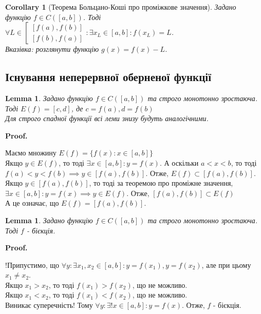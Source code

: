 \documentclass[a4paper, 14pt]{article}
\makeatletter
\def\qed{$\blacksquare$}
\theoremstyle{theoremdd}
\theoremstyle{theoremdd}
\theoremstyle{theoremdd}
\theoremstyle{theoremdd}
\theoremstyle{theoremdd}
\theoremstyle{theoremdd}
\theoremstyle{theoremdd}
\newtheorem{lemma}[theorem]{Lemma}
\theoremstyle{theoremdd}
\newtheorem{corollary}[theorem]{Corollary}
\renewenvironment{proof}[1][Proof.\\]{\par
\pushQED{\hfill \qed}%
\normalfont \topsep6\p@\@plus6\p@\relax
\trivlist
\item\relax
{\bfseries
#1\@addpunct{.}}\hspace\labelsep\ignorespaces
}{%
\popQED\endtrivlist\@endpefalse
}
\makeatother
\begin{document}
\begin{corollary}[Теорема Больцано-Коші про проміжкове значення]
Задано функцію $f \in C([a,b])$.
Тоді $\forall L \in \left[ \begin{gathered}  \left[f(a),f(b) \right] \\ \left[f(b),f(a) \right] \end{gathered} \right.: \exists x_L \in [a,b]: f(x_L) = L$.\\
\textit{Вказівка: розглянути функцію $g(x) = f(x) - L$.}
\end{corollary}

\subsection{Існування неперервної оберненої функції}
\begin{lemma}
Задано функцію $f \in C([a,b])$ та строго монотонно зростаюча. Тоді $E(f) = [c,d]$, де $c = f(a), d = f(b)$\\
\textit{Для строго спадної функції всі леми знизу будуть аналогічними.}
\end{lemma}

\begin{proof}
Маємо множину $E(f) = \{f(x): x \in [a,b] \}$\\
Якщо $y \in E(f)$, то тоді $\exists x \in [a,b]: y = f(x)$. А оскільки $a < x < b$, то тоді $f(a) < y < f(b) \implies y \in [f(a),f(b)]$. Отже, $E(f) \subset [f(a),f(b)]$.\\
Якщо $y \in [f(a),f(b)]$, то тоді за теоремою про проміжне значення, $\exists x \in [a,b]: y = f(x) \implies y \in E(f)$. Отже, $[f(a),f(b)] \subset E(f)$\\
А це означає, що $E(f) = [f(a),f(b)]$.
\end{proof}

\begin{lemma}
Задано функцію $f \in C([a,b])$ та строго монотонно зростаюча. Тоді $f$ - бієкція.
\end{lemma}

\begin{proof}
!Припустимо, що $\forall y: \exists x_1,x_2 \in [a,b]: y = f(x_1), y = f(x_2)$, але при цьому $x_1 \neq x_2$.\\
Якщо $x_1 > x_2$, то тоді $f(x_1) > f(x_2)$, що не можливо.\\
Якщо $x_1 < x_2$, то тоді $f(x_1) < f(x_2)$, що не можливо.\\
Виникає суперечність! Тому $\forall y: \exists! x \in [a,b]: y = f(x)$. Отже, $f$ - бієкція.
\end{proof}
\end{document}
